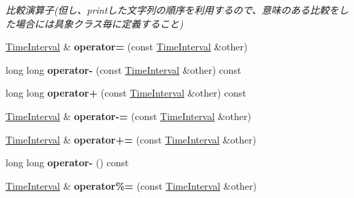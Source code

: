 \begin{DoxyCompactItemize}
\begin{DoxyCompactList}\small\item\em 比較演算子(但し、printした文字列の順序を利用するので、意味のある比較をした場合には具象クラス毎に定義すること) \end{DoxyCompactList}\item 
\hypertarget{classskl_1_1_time_interval_af2846332871234fdb1e6eb1b50ea3105}{}\label{classskl_1_1_time_interval_af2846332871234fdb1e6eb1b50ea3105} 
\hyperlink{classskl_1_1_time_interval}{Time\+Interval} \& {\bfseries operator=} (const \hyperlink{classskl_1_1_time_interval}{Time\+Interval} \&other)
\item 
\hypertarget{classskl_1_1_time_interval_a7b4730d6e3512cf5a81d984452b9ee3f}{}\label{classskl_1_1_time_interval_a7b4730d6e3512cf5a81d984452b9ee3f} 
long long {\bfseries operator-\/} (const \hyperlink{classskl_1_1_time_interval}{Time\+Interval} \&other) const
\item 
\hypertarget{classskl_1_1_time_interval_afe7e4bed83dfd04b54bac4fe7f68ebe5}{}\label{classskl_1_1_time_interval_afe7e4bed83dfd04b54bac4fe7f68ebe5} 
long long {\bfseries operator+} (const \hyperlink{classskl_1_1_time_interval}{Time\+Interval} \&other) const
\item 
\hypertarget{classskl_1_1_time_interval_a74ec9555c6d258bd3b8627a60ca5c634}{}\label{classskl_1_1_time_interval_a74ec9555c6d258bd3b8627a60ca5c634} 
\hyperlink{classskl_1_1_time_interval}{Time\+Interval} \& {\bfseries operator-\/=} (const \hyperlink{classskl_1_1_time_interval}{Time\+Interval} \&other)
\item 
\hypertarget{classskl_1_1_time_interval_a8a27f01d1abea70e9fea32aa79de79c3}{}\label{classskl_1_1_time_interval_a8a27f01d1abea70e9fea32aa79de79c3} 
\hyperlink{classskl_1_1_time_interval}{Time\+Interval} \& {\bfseries operator+=} (const \hyperlink{classskl_1_1_time_interval}{Time\+Interval} \&other)
\item 
\hypertarget{classskl_1_1_time_interval_a7a30ed02d174a90446b5788a674e0647}{}\label{classskl_1_1_time_interval_a7a30ed02d174a90446b5788a674e0647} 
long long {\bfseries operator-\/} () const
\item 
\hypertarget{classskl_1_1_time_interval_a3361133892254c113d238ab4ae0060f3}{}\label{classskl_1_1_time_interval_a3361133892254c113d238ab4ae0060f3} 
\hyperlink{classskl_1_1_time_interval}{Time\+Interval} \& {\bfseries operator\%=} (const \hyperlink{classskl_1_1_time_interval}{Time\+Interval} \&other)
\item 
\hypertarget{classskl_1_1_time_interval_aae7818a395cdf61c2672a80ddb73ae86}{}\label{classskl_1_1_time_interval_aae7818a395cdf61c2672a80ddb73ae86} 

\end{DoxyCompactItemize}

